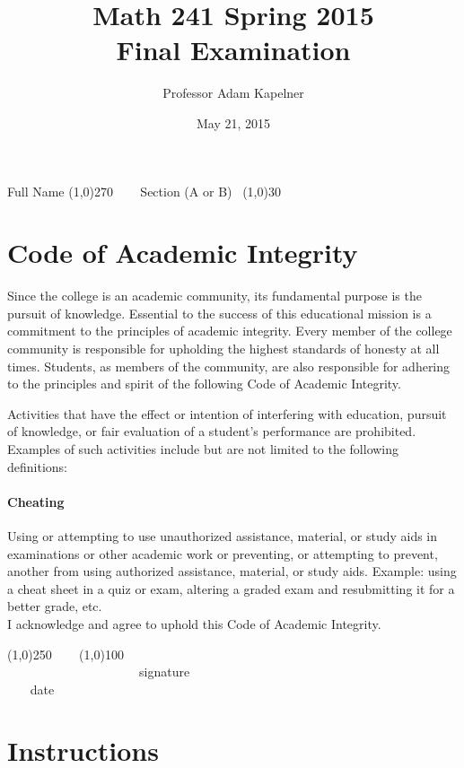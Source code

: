 \documentclass[12pt]{article}
\title{Math 241 Spring 2015 \\ Final Examination}
\author{Professor Adam Kapelner}
\date{May 21, 2015}
\begin{document}
\maketitle

\noindent Full Name \line(1,0){270} ~~~ Section (A or B)~ \line(1,0){30}

\thispagestyle{empty}

\section*{Code of Academic Integrity}

\footnotesize
Since the college is an academic community, its fundamental purpose is the pursuit of knowledge. Essential to the success of this educational mission is a commitment to the principles of academic integrity. Every member of the college community is responsible for upholding the highest standards of honesty at all times. Students, as members of the community, are also responsible for adhering to the principles and spirit of the following Code of Academic Integrity.

Activities that have the effect or intention of interfering with education, pursuit of knowledge, or fair evaluation of a student's performance are prohibited. Examples of such activities include but are not limited to the following definitions:

\paragraph{Cheating} Using or attempting to use unauthorized assistance, material, or study aids in examinations or other academic work or preventing, or attempting to prevent, another from using authorized assistance, material, or study aids. Example: using a cheat sheet in a quiz or exam, altering a graded exam and resubmitting it for a better grade, etc.
\\

\noindent I acknowledge and agree to uphold this Code of Academic Integrity. \\

\begin{center}
\line(1,0){250} ~~~ \line(1,0){100}\\
~~~~~~~~~~~~~~~~~~~~~signature~~~~~~~~~~~~~~~~~~~~~~~~~~~~~~~~~~~~~~~~~~~~~ date
\end{center}

\normalsize

\section*{Instructions}
\end{document}
